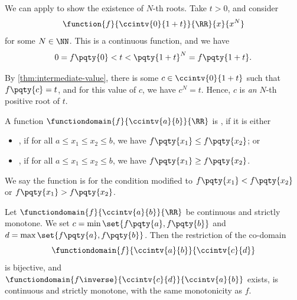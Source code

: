 \begin{example}
    \label{ex:existence-nth-roots}%
    We can apply to show the existence of \(N\)-th roots. Take \(t > 0\), and consider
    \[
        \function{f}{\ccintv{0}{1 + t}}{\RR}{x}{x^N}
    \]
    for some \(N \in \NN\). This is a continuous function, and we have
    \[
        0 = f\pqty{0} < t < \pqty{1 + t}^N = f\pqty{1 + t}.
    \]

    By \autoref{thm:intermediate-value}, there is some \(c \in \ccintv{0}{1 + t}\) such that \(f\pqty{c} = t\), and for this value of \(c\), we have \(c^N = t\). Hence, \(c\) is \emph{an} \(N\)-th positive root of \(t\).
\end{example}

\begin{definition}
    \label{def:monotone-function}%
    A function \(\functiondomain{f}{\ccintv{a}{b}}{\RR}\) is , if it is either
    \begin{itemize}
        \item {}, if for all \(a \leq x_1 \leq x_2 \leq b\), we have \(f\pqty{x_1} \leq f\pqty{x_2}\); or
        \item {}, if for all \(a \leq x_1 \leq x_2 \leq b\), we have \(f\pqty{x_1} \geq f\pqty{x_2}\).
    \end{itemize}

    We say the function is  for the condition modified to \(f\pqty{x_1} < f\pqty{x_2}\) or \(f\pqty{x_1} > f\pqty{x_2}\).
\end{definition}

\begin{theorem}
    \label{thm:inverse-fn-thm-monotone}
    Let \(\functiondomain{f}{\ccintv{a}{b}}{\RR}\) be continuous and strictly monotone. We set \(c = \min\set{f\pqty{a}, f\pqty{b}}\) and \(d = \max\set{f\pqty{a}, f\pqty{b}}\). Then the restriction of the co-domain
    \[
        \functiondomain{f}{\ccintv{a}{b}}{\ccintv{c}{d}}
    \]
    is bijective, and \(\functiondomain{f\inverse}{\ccintv{c}{d}}{\ccintv{a}{b}}\) exists, is continuous and strictly monotone, with the same monotonicity as \(f\).
\end{theorem}

